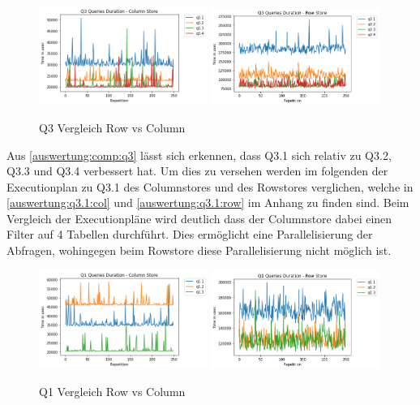 \begin{figure}[H]
	\centering
	\includegraphics[width=0.49\textwidth]{images/q3-col.png}
	\includegraphics[width=0.49\textwidth]{images/q3-row.png}
	\caption{Q3 Vergleich Row vs Column}\label{auswertung:comp:q3}
\end{figure}

Aus \autoref{auswertung:comp:q3} lässt sich erkennen, dass Q3.1 sich relativ
zu Q3.2, Q3.3 und Q3.4 verbessert hat.
Um dies zu versehen werden im folgenden der Executionplan zu Q3.1 des Columnstores
und des Rowstores verglichen, welche in \autoref{auswertung:q3.1:col} und 
\autoref{auswertung:q3.1:row} im Anhang zu finden sind.
Beim Vergleich der Executionpläne wird deutlich dass der Columnstore dabei
einen Filter auf 4 Tabellen durchführt.
Dies ermöglicht eine Parallelisierung der Abfragen,
wohingegen beim Rowstore diese Parallelisierung nicht möglich ist.

\begin{figure}[H]
	\centering
	\includegraphics[width=0.49\textwidth]{images/q1-col.png}
	\includegraphics[width=0.49\textwidth]{images/q1-row.png}
	\caption{Q1 Vergleich Row vs Column}\label{auswertung:comp:q1}
\end{figure}

